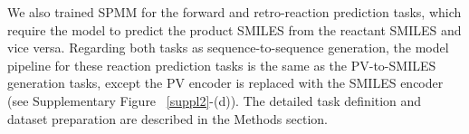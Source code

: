 \documentclass{nature_meth}
\newcommand{\1}{\blmath{1}}
\newcommand{\0}{\blmath{0}}
\begin{document}
\begin{table}[!hbt]
\centering
{}
\vspace*{-0.5cm}
\caption{\bf\footnotesize 
The DILI classification task performance of Ai \emph{et al.}\cite{dili2018} and SPMM. The best performance for each metric was written in bold. }
\label{table_lidi}
\end{table}

We also trained SPMM for the forward and retro-reaction prediction tasks, which require the model to predict the product SMILES from the reactant SMILES and vice versa. Regarding both tasks as sequence-to-sequence generation, the model pipeline for these reaction prediction tasks is the same as the PV-to-SMILES generation tasks, except the PV encoder is replaced with the SMILES encoder (see Supplementary Figure ~\ref{suppl2}-(d)). The detailed task definition and dataset preparation are described in the Methods section. 
\end{document}
